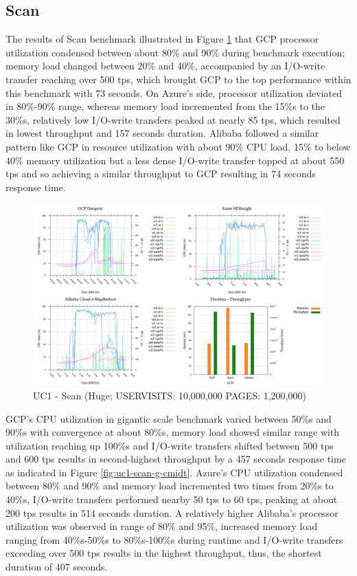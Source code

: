 \documentclass[review]{elsarticle}
\begin{document}
\subsection{Scan}
The results of Scan benchmark illustrated in Figure \ref{fig:uc1-scan-h-cmidt} that GCP processor utilization condensed between about 80\% and 90\% during benchmark execution; memory load changed between 20\% and 40\%, accompanied by an I/O-write transfer reaching over 500 tps, which brought GCP to the top performance within this benchmark with 73 seconds. On Azure's side, processor utilization deviated in 80\%-90\% range, whereas memory load incremented from the 15\%s to the 30\%s, relatively low I/O-write transfers peaked at nearly 85 tps, which resulted in lowest throughput and 157 seconds duration. Alibaba followed a similar pattern like GCP in resource utilization with about 90\% CPU load, 15\% to below 40\% memory utilization but a less dense I/O-write transfer topped at about 550 tps and so achieving a similar throughput to GCP resulting in 74 seconds response time.

\begin{figure}[p]
	\caption{UC1 - Scan (Huge; USERVISITS: 10,000,000 PAGES: 1,200,000)}
	\label{fig:uc1-scan-h-cmidt}
	\includegraphics[width=\textwidth]{uc1-scan-h-cmidt}
	\centering
\end{figure}

GCP's CPU utilization in gigantic scale benchmark varied between 50\%s and 90\%s with convergence at about 80\%s, memory load showed similar range with utilization reaching up 100\%s and I/O-write transfers shifted between 500 tps and 600 tps results in second-highest throughput by a 457 seconds response time as indicated in Figure \ref{fig:uc1-scan-g-cmidt}. Azure's CPU utilization condensed between 80\% and 90\% and memory load incremented two times from 20\%s to 40\%s, I/O-write transfers performed nearby 50 tps to 60 tps, peaking at about 200 tps results in 514 seconds duration. A relatively higher Alibaba's processor utilization was observed in range of 80\% and 95\%, increased memory load ranging from 40\%s-50\%s to 80\%s-100\%s during runtime and I/O-write transfers exceeding over 500 tps results in the highest throughput, thus, the shortest duration of 407 seconds.
\end{document}
